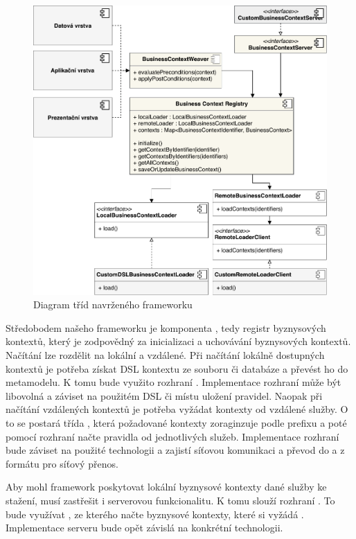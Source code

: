 \begin{figure}
    \centering
    \includegraphics[keepaspectratio=true, width=\linewidth]{figures/business-context-registry.pdf}
    \caption{Diagram tříd navrženého frameworku}
    \label{fig:business-context-registry}
\end{figure}

Středobodem našeho frameworku je komponenta , tedy registr
byznysových kontextů, který je zodpovědný za inicializaci a uchovávání byznysových kontextů.
Načítání lze rozdělit na lokální a vzdálené. Při načítání lokálně dostupných kontextů
je potřeba získat \gls{DSL} kontextu ze souboru či databáze a převést ho do metamodelu.
K tomu bude využito rozhraní . Implementace rozhraní může být libovolná
a záviset na použitém \gls{DSL} či místu uložení pravidel. Naopak při načítání vzdálených
kontextů je potřeba vyžádat kontexty od vzdálené služby. O to se postará třída ,
která požadované kontexty zoraginzuje podle prefixu a poté pomocí rozhraní  načte
pravidla od jednotlivých služeb. Implementace rozhraní  bude záviset na použité
technologii a zajistí síťovou komunikaci a převod do a z formátu pro síťový přenos.

Aby mohl framework poskytovat lokální byznysové kontexty dané služby ke stažení, musí zastřešit
i serverovou funkcionalitu. K tomu slouží rozhraní . To bude využívat
, ze kterého načte byznysové kontexty, které si vyžádá .
Implementace serveru bude opět závislá na konkrétní technologii.

